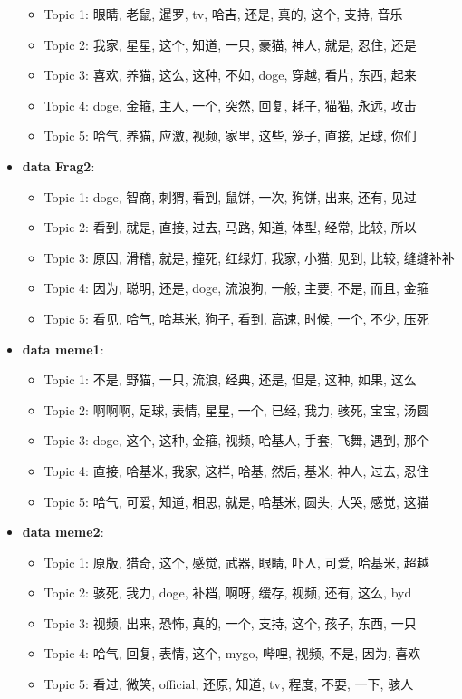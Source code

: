 \documentclass[12pt,a4paper]{ctexart}
\begin{document}
\begin{itemize}
\begin{itemize}
        \item Topic 1: 眼睛, 老鼠, 暹罗, tv, 哈吉, 还是, 真的, 这个, 支持, 音乐
        \item Topic 2: 我家, 星星, 这个, 知道, 一只, 豪猫, 神人, 就是, 忍住, 还是
        \item Topic 3: 喜欢, 养猫, 这么, 这种, 不如, doge, 穿越, 看片, 东西, 起来
        \item Topic 4: doge, 金箍, 主人, 一个, 突然, 回复, 耗子, 猫猫, 永远, 攻击
        \item Topic 5: 哈气, 养猫, 应激, 视频, 家里, 这些, 笼子, 直接, 足球, 你们
    \end{itemize}
    \item \textbf{data Frag2}:
    \begin{itemize}
        \item Topic 1: doge, 智商, 刺猬, 看到, 鼠饼, 一次, 狗饼, 出来, 还有, 见过
        \item Topic 2: 看到, 就是, 直接, 过去, 马路, 知道, 体型, 经常, 比较, 所以
        \item Topic 3: 原因, 滑稽, 就是, 撞死, 红绿灯, 我家, 小猫, 见到, 比较, 缝缝补补
        \item Topic 4: 因为, 聪明, 还是, doge, 流浪狗, 一般, 主要, 不是, 而且, 金箍
        \item Topic 5: 看见, 哈气, 哈基米, 狗子, 看到, 高速, 时候, 一个, 不少, 压死
    \end{itemize}
    \item \textbf{data meme1}:
    \begin{itemize}
        \item Topic 1: 不是, 野猫, 一只, 流浪, 经典, 还是, 但是, 这种, 如果, 这么
        \item Topic 2: 啊啊啊, 足球, 表情, 星星, 一个, 已经, 我力, 骇死, 宝宝, 汤圆
        \item Topic 3: doge, 这个, 这种, 金箍, 视频, 哈基人, 手套, 飞舞, 遇到, 那个
        \item Topic 4: 直接, 哈基米, 我家, 这样, 哈基, 然后, 基米, 神人, 过去, 忍住
        \item Topic 5: 哈气, 可爱, 知道, 相思, 就是, 哈基米, 圆头, 大哭, 感觉, 这猫
    \end{itemize}
    \item \textbf{data meme2}:
    \begin{itemize}
        \item Topic 1: 原版, 猎奇, 这个, 感觉, 武器, 眼睛, 吓人, 可爱, 哈基米, 超越
        \item Topic 2: 骇死, 我力, doge, 补档, 啊呀, 缓存, 视频, 还有, 这么, byd
        \item Topic 3: 视频, 出来, 恐怖, 真的, 一个, 支持, 这个, 孩子, 东西, 一只
        \item Topic 4: 哈气, 回复, 表情, 这个, mygo, 哔哩, 视频, 不是, 因为, 喜欢
        \item Topic 5: 看过, 微笑, official, 还原, 知道, tv, 程度, 不要, 一下, 骇人
    \end{itemize}
\end{itemize}
\end{document}
